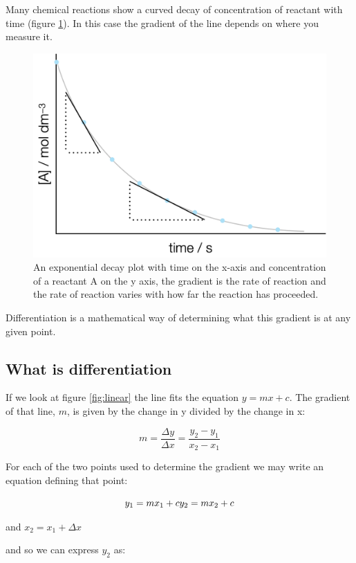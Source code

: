 \documentclass[
]{book}
\begin{document}
Many chemical reactions show a curved decay of concentration of reactant with time (figure \ref{fig:expplot}). In this case the gradient of the line depends on where you measure it.

\begin{figure}

{\centering \includegraphics[width=0.5\linewidth]{images/expplot} 

}

\caption{An exponential decay plot with time on the x-axis and concentration of a reactant A on the y axis, the gradient is the rate of reaction and the rate of reaction varies with how far the reaction has proceeded.}\label{fig:expplot}
\end{figure}

Differentiation is a mathematical way of determining what this gradient is at any given point.

\hypertarget{subsec:whatisdiff}{%
\subsection{What is differentiation}\label{subsec:whatisdiff}}

If we look at figure \ref{fig:linear} the line fits the equation \(y = mx+c\). The gradient of that line, \(m\), is given by the change in y divided by the change in x:

\begin{equation*}
m = \frac{\Delta y}{\Delta x} = \frac{y_2-y_1}{x_2-x_1}
\end{equation*}

For each of the two points used to determine the gradient we may write an equation defining that point:

\begin{equation*}
y_1 = mx_1 + c\\
y_2 = mx_2 + c
\end{equation*}

and \(x_2 = x_1+\Delta x\)

and so we can express \(y_2\) as:
\end{document}
